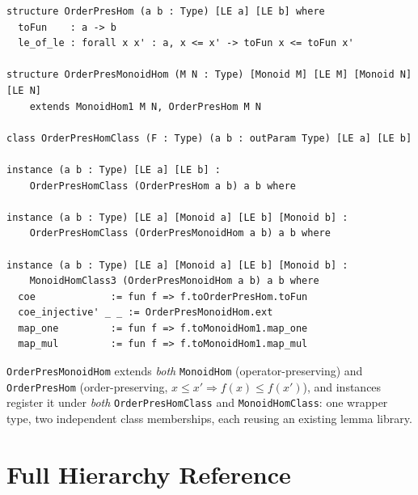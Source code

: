 \documentclass[11pt]{article}
\begin{document}
\begin{lstlisting}
structure OrderPresHom (a b : Type) [LE a] [LE b] where
  toFun    : a -> b
  le_of_le : forall x x' : a, x <= x' -> toFun x <= toFun x'

structure OrderPresMonoidHom (M N : Type) [Monoid M] [LE M] [Monoid N] [LE N]
    extends MonoidHom1 M N, OrderPresHom M N

class OrderPresHomClass (F : Type) (a b : outParam Type) [LE a] [LE b]

instance (a b : Type) [LE a] [LE b] :
    OrderPresHomClass (OrderPresHom a b) a b where

instance (a b : Type) [LE a] [Monoid a] [LE b] [Monoid b] :
    OrderPresHomClass (OrderPresMonoidHom a b) a b where

instance (a b : Type) [LE a] [Monoid a] [LE b] [Monoid b] :
    MonoidHomClass3 (OrderPresMonoidHom a b) a b where
  coe             := fun f => f.toOrderPresHom.toFun
  coe_injective' _ _ := OrderPresMonoidHom.ext
  map_one         := fun f => f.toMonoidHom1.map_one
  map_mul         := fun f => f.toMonoidHom1.map_mul
\end{lstlisting}

\texttt{OrderPresMonoidHom} extends \emph{both} \texttt{MonoidHom} (operator-preserving) and \texttt{OrderPresHom} (order-preserving, $x \le x' \Rightarrow f(x) \le f(x')$), and instances register it under \emph{both} \texttt{OrderPresHomClass} and \texttt{MonoidHomClass}: one wrapper type, two independent class memberships, each reusing an existing lemma library.

\section{Full Hierarchy Reference}
\label{sec:reference}
\end{document}
